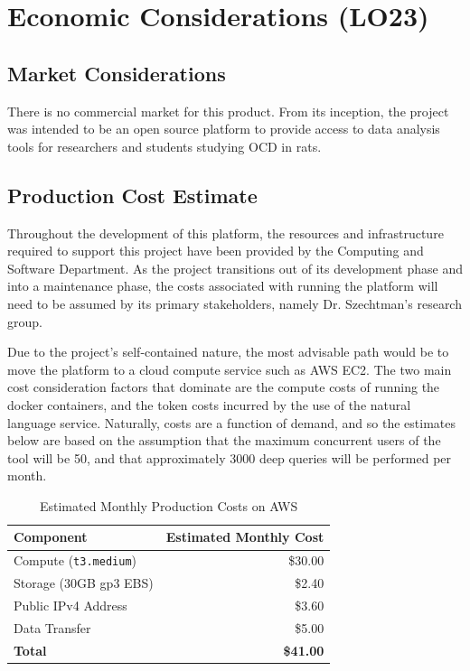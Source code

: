 \documentclass{article}
\begin{document}
\section{Economic Considerations (LO23)}


\subsection{Market Considerations}

There is no commercial market for this product. From its inception, the project was intended to be an open source platform to provide access to data analysis tools for researchers and students studying OCD in rats. 

\subsection{Production Cost Estimate}

Throughout the development of this platform, the resources and infrastructure required to support this project have been provided by the Computing and Software Department. As the project transitions out of its development phase and into a maintenance phase, the costs associated with running the platform will need to be assumed by its primary stakeholders, namely Dr. Szechtman's research group. 

Due to the project's self-contained nature, the most advisable path would be to move the platform to a cloud compute service such as AWS EC2. The two main cost consideration factors that dominate are the compute costs of running the docker containers, and the token costs incurred by the use of the natural language service. Naturally, costs are a function of demand, and so the estimates below are based on the assumption that the maximum concurrent users of the tool will be 50, and that approximately 3000 deep queries will be performed per month. 

\begin{table}[H]
\centering
\caption{Estimated Monthly Production Costs on AWS}
\label{tab:ProductionCosts}
\begin{tabularx}{0.8\textwidth}{Xr}
\toprule
\textbf{Component} & \textbf{Estimated Monthly Cost} \\
\midrule
Compute (\texttt{t3.medium}) & \$30.00 \\
Storage (30GB gp3 EBS) & \$2.40 \\
Public IPv4 Address & \$3.60 \\
Data Transfer & \$5.00 \\
\midrule
\textbf{Total} & \textbf{\$41.00} \\
\bottomrule
\end{tabularx}
\end{table}
\end{document}
